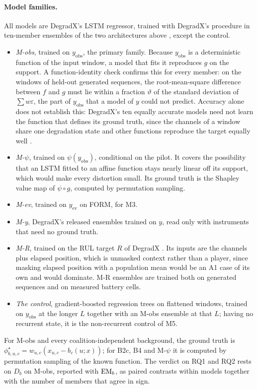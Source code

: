 \documentclass{article}
\begin{document}
\paragraph{Model families.} All models are DegradX's LSTM regressor, trained with DegradX's procedure in ten-member ensembles of the two architectures above \citep{degradxrepo}, except the control.
\begin{itemize}
\item \emph{M-obs}, trained on $y_{\mathrm{obs}}$, the primary family. Because $y_{\mathrm{obs}}$ is a deterministic function of the input window, a model that fits it reproduces $g$ on the support. A function-identity check confirms this for every member: on the windows of held-out generated sequences, the root-mean-square difference between $f$ and $g$ must lie within a fraction $\vartheta$ of the standard deviation of $\sum w\varepsilon$, the part of $y_{\mathrm{obs}}$ that a model of $y$ could not predict. Accuracy alone does not establish this: DegradX's ten equally accurate models need not learn the function that defines its ground truth, since the channels of a window share one degradation state and other functions reproduce the target equally well \citep{degradx2026}.
\item \emph{M-$\psi$}, trained on $\psi(y_{\mathrm{obs}})$, conditional on the pilot. It covers the possibility that an LSTM fitted to an affine function stays nearly linear off its support, which would make every distortion small. Its ground truth is the Shapley value map of $\psi\circ g$, computed by permutation sampling.
\item \emph{M-ev}, trained on $y_{\mathrm{ev}}$ on FORM, for M3.
\item \emph{M-y}, DegradX's released ensembles trained on $y$, read only with instruments that need no ground truth.
\item \emph{M-R}, trained on the RUL target $R$ of DegradX \citep{degradx2026}. Its inputs are the channels plus elapsed position, which is unmasked context rather than a player, since masking elapsed position with a population mean would be an A1 case of its own and would dominate. M-R ensembles are trained both on generated sequences and on measured battery cells.
\item \emph{The control}, gradient-boosted regression trees \citep{friedman2001greedy} on flattened windows, trained on $y_{\mathrm{obs}}$ at the longer $L$ together with an M-obs ensemble at that $L$; having no recurrent state, it is the non-recurrent control of M5.
\end{itemize}
For M-obs and every coalition-independent background, the ground truth is $\phi^\star_{b,u,c} = w_{u,c}(x_{u,c}-b_c(u;x))$; for B2c, B4 and M-$\psi$ it is computed by permutation sampling of the known function. The verdict on RQ1 and RQ2 rests on $D_b$ on M-obs, reported with $\mathrm{EM}_b$, as paired contrasts within models together with the number of members that agree in sign.
\end{document}
